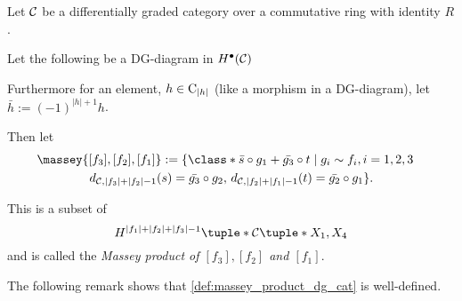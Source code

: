 \begin{definition}
    \label{def:massey_product_dg_cat}
    Let \( {\mathcal{C}} \) be a differentially graded category over a commutative ring with identity \( R \).

    Let the following be a DG-diagram in \( H^\bullet({\mathcal{C}}) \)
    \begin{center}
    \end{center}

    Furthermore for an element, \( h \in \operatorname{C}_{|h|} \) (like a morphism in a DG-diagram), let \( \bar{h} := (-1)^{|h| + 1}h \).

    Then let
    \begin{multline*}
        \massey{[f_3], [f_2], [f_1]} :=
        \{
            \class*{
                \bar{s} \circ g_1 + \bar{g_3} \circ t
            }
            \mid g_i \sim f_i, i = 1, 2, 3 \quad \\
            d_{\Cc, |f_3| + |f_2| - 1}(s) = \bar{g_3} \circ g_2, \,
            d_{\Cc, |f_2| + |f_1| - 1}(t) = \bar{g_2} \circ g_1
        \}.
    \end{multline*}

    This is a subset of
    \[
        H^{|f_1| + |f_2| + |f_3| - 1}\tuple*{\Cc\tuple*{X_1, X_4}}
    \]
    and is called the \emph{Massey product of \( [f_3], [f_2] \) and \( [f_1] \)}.
\end{definition}

The following remark shows that \autoref{def:massey_product_dg_cat} is well-defined.

